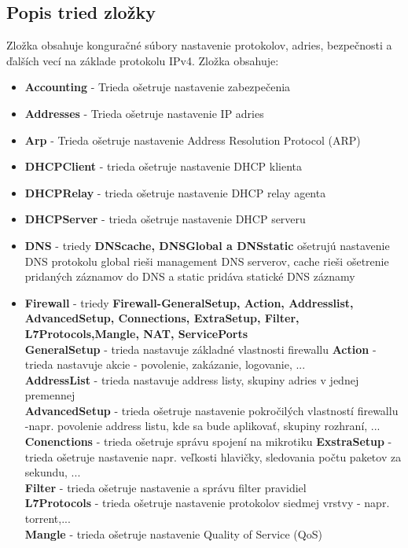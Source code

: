 \subsection{Popis tried zložky}
Zložka obsahuje konguračné súbory nastavenie protokolov, adries, bezpečnosti a ďalších vecí na základe protokolu  IPv4. Zložka obsahuje:
\begin{itemize}
\item \textbf{Accounting} - Trieda ošetruje nastavenie zabezpečenia
\item \textbf{Addresses} - Trieda ošetruje nastavenie IP adries
\item \textbf{Arp} - Trieda ošetruje nastavenie Address Resolution Protocol (ARP) 
\item \textbf{DHCPClient} - trieda ošetruje nastavenie DHCP klienta
\item \textbf{DHCPRelay} - trieda ošetruje nastavenie DHCP relay agenta
\item \textbf{DHCPServer} - trieda ošetruje nastavenie DHCP serveru
\item \textbf{DNS} - triedy \textbf{DNScache, DNSGlobal a DNSstatic} ošetrujú nastavenie DNS protokolu global rieši management DNS serverov, cache rieši ošetrenie pridaných záznamov do DNS a static pridáva statické DNS záznamy
\item \textbf{Firewall} - triedy \textbf{Firewall-GeneralSetup, Action, Addresslist, AdvancedSetup,  Connections, ExtraSetup, Filter, L7Protocols,Mangle, NAT, ServicePorts}\\
\textbf{GeneralSetup} - trieda nastavuje základné vlastnosti firewallu
\textbf{Action} - trieda nastavuje akcie - povolenie, zakázanie, logovanie, ... \\
\textbf{AddressList} - trieda nastavuje address listy, skupiny adries v jednej premennej\\
\textbf{AdvancedSetup} - trieda ošetruje nastavenie pokročilých vlastností firewallu -napr. povolenie address listu, kde sa bude aplikovať, skupiny rozhraní, ...\\
\textbf{Conenctions} - trieda ošetruje správu spojení na mikrotiku
\textbf{ExstraSetup} - trieda ošetruje nastavenie napr. veľkosti hlavičky, sledovania počtu paketov za sekundu, ...\\
\textbf{Filter} - trieda ošetruje nastavenie a správu filter pravidiel\\
\textbf{L7Protocols} - trieda ošetruje nastavenie  protokolov siedmej vrstvy - napr. torrent,...\\
\textbf{Mangle} - trieda ošetruje nastavenie Quality of Service (QoS)\\

\end{itemize}
